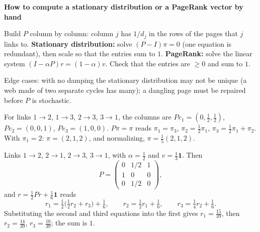\documentclass[10pt]{scrartcl}
\newcommand{\one}{\mathbf 1}
\newenvironment{methodbox}[1]{\begin{mdframed}[style=methodstyle]\textbf{\color{NavyBlue}#1}\par\vspace{2pt}}{\end{mdframed}}
\begin{document}
\begin{methodbox}{How to compute a stationary distribution or a PageRank vector by hand}
  \begin{steps}
    \ii Build $P$ column by column: column $j$ has $1/d_j$ in the rows of the pages that $j$ links to.
    \ii \textbf{Stationary distribution:} solve $(P-I)\pi=0$ (one equation is redundant), then scale so that the entries sum to $1$.
    \ii \textbf{PageRank:} solve the linear system $(I-\alpha P)r=(1-\alpha)v$. Check that the entries are $\ge0$ and sum to $1$.
  \end{steps}
  Edge cases: with no damping the stationary distribution may not be unique (a web made of two separate cycles has many); a dangling page must be repaired before $P$ is stochastic.
\end{methodbox}

\begin{example*}
  For links $1\to2$, $1\to3$, $2\to3$, $3\to1$, the columns are $P e_1=(0,\tfrac12,\tfrac12)$, $Pe_2=(0,0,1)$, $Pe_3=(1,0,0)$. $P\pi=\pi$ reads $\pi_1=\pi_3$, $\pi_2=\tfrac12\pi_1$, $\pi_3=\tfrac12\pi_1+\pi_2$. With $\pi_1=2$: $\pi=(2,1,2)$, and normalizing, $\pi=\tfrac15(2,1,2)$.
\end{example*}

\begin{example*}
  Links $1\to2$, $2\to1$, $2\to3$, $3\to1$, with $\alpha=\tfrac12$ and $v=\tfrac13\one$. Then
  \[
    P=\begin{pmatrix}0&1/2&1\\1&0&0\\0&1/2&0\end{pmatrix},
  \]
  and $r=\tfrac12Pr+\tfrac16\one$ reads
  \[
    r_1=\tfrac12\bigl(\tfrac12r_2+r_3\bigr)+\tfrac16,\qquad r_2=\tfrac12r_1+\tfrac16,\qquad r_3=\tfrac14r_2+\tfrac16 .
  \]
  Substituting the second and third equations into the first gives $r_1=\tfrac{15}{39}$, then $r_2=\tfrac{14}{39}$, $r_3=\tfrac{10}{39}$; the sum is $1$.
\end{example*}
\end{document}

